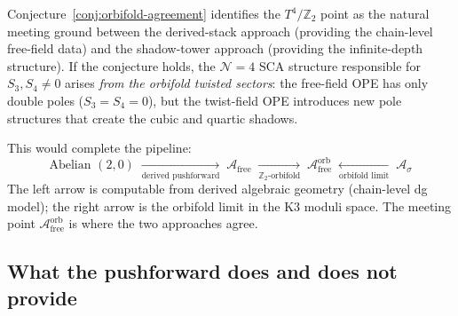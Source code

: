 \documentclass[11pt]{article}
\newcommand{\cA}{\mathcal{A}}
\newcommand{\cN}{\mathcal{N}}
\newcommand{\Z}{\mathbb{Z}}
\begin{document}
\begin{remark}
\label{rem:orbifold-meeting}
Conjecture~\ref{conj:orbifold-agreement} identifies the $T^4/\Z_2$ point as the natural meeting ground between the derived-stack approach (providing the chain-level free-field data) and the shadow-tower approach (providing the infinite-depth structure). If the conjecture holds, the $\cN = 4$ SCA structure responsible for $S_3, S_4 \neq 0$ arises \emph{from the orbifold twisted sectors}: the free-field OPE has only double poles ($S_3 = S_4 = 0$), but the twist-field OPE introduces new pole structures that create the cubic and quartic shadows.

This would complete the pipeline:
\[
 \text{Abelian $(2,0)$} \;\xrightarrow[\text{derived pushforward}]{}\; \cA_{\mathrm{free}} \;\xrightarrow[\Z_2\text{-orbifold}]{}\; \cA_{\mathrm{free}}^{\mathrm{orb}} \;\xleftarrow[\text{orbifold limit}]{}\; \cA_\sigma
\]
The left arrow is computable from derived algebraic geometry (chain-level dg model); the right arrow is the orbifold limit in the K3 moduli space. The meeting point $\cA_{\mathrm{free}}^{\mathrm{orb}}$ is where the two approaches agree.
\end{remark}

\subsection{What the pushforward does and does not provide}
\label{subsec:pushforward-verdict}
\end{document}
